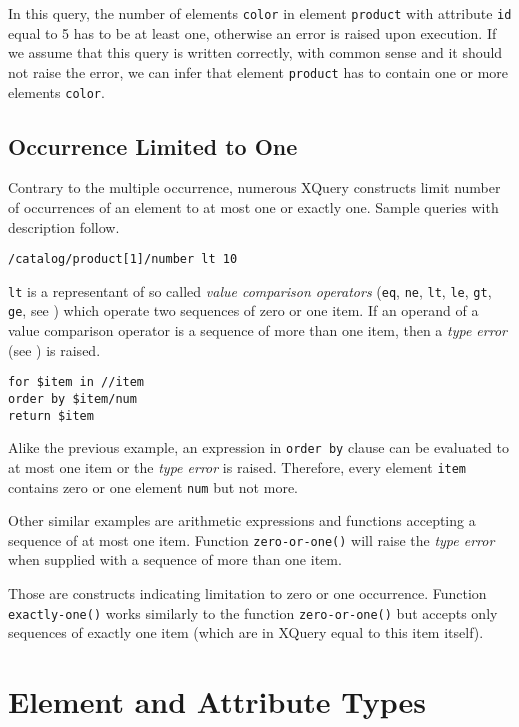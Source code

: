 In this query, the number of elements \texttt{color} in element \texttt{product} with attribute \texttt{id} equal to 5 has to be at least one, otherwise an error is raised upon execution. If we assume that this query is written correctly, with common sense and it should not raise the error, we can infer that element \texttt{product} has to contain one or more elements \texttt{color}.

\subsection{Occurrence Limited to One}
Contrary to the multiple occurrence, numerous XQuery constructs limit number of occurrences of an element to at most one or exactly one. Sample queries with description follow.

\begin{verbatim}
/catalog/product[1]/number lt 10
\end{verbatim}

\texttt{lt} is a representant of so called \emph{value comparison operators} (\texttt{eq}, \texttt{ne}, \texttt{lt}, \texttt{le}, \texttt{gt}, \texttt{ge}, see \cite{w3c_xquery}) which operate two sequences of zero or one item. If an operand of a value comparison operator is a sequence of more than one item, then a \emph{type error} (see \cite{w3c_xquery}) is raised.

\begin{verbatim}
for $item in //item 
order by $item/num 
return $item
\end{verbatim}

Alike the previous example, an expression in \texttt{order by} clause can be evaluated to at most one item or the \emph{type error} is raised. Therefore, every element \texttt{item} contains zero or one element \texttt{num} but not more.

Other similar examples are arithmetic expressions and functions accepting a sequence of at most one item. Function \texttt{zero-or-one()} will raise the \emph{type error} when supplied with a sequence of more than one item.

Those are constructs indicating limitation to zero or one occurrence. Function \texttt{exactly-one()} works similarly to the function \texttt{zero-or-one()} but accepts only sequences of exactly one item (which are in XQuery equal to this item itself).

\section{Element and Attribute Types}

